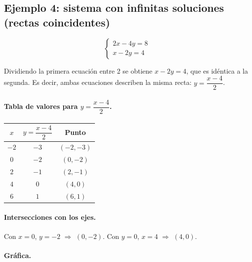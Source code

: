 \documentclass[12pt]{article}
\begin{document}
\subsection{Ejemplo 4: sistema con infinitas soluciones (rectas coincidentes)}

\[
\begin{cases}
2x - 4y = 8 \\
x - 2y = 4
\end{cases}
\]

Dividiendo la primera ecuación entre 2 se obtiene \(x-2y=4\), que es idéntica a la segunda. Es decir, ambas ecuaciones describen la misma recta: \(y=\dfrac{x-4}{2}\).

\paragraph{Tabla de valores para \(y=\dfrac{x-4}{2}\).}

\begin{center}
\begin{tabular}{ccc}
\toprule
\(x\) & \(y=\dfrac{x-4}{2}\) & Punto \\
\midrule
\(-2\) & \(-3\) & \((-2,-3)\) \\
\(0\)  & \(-2\) & \((0,-2)\) \\
\(2\)  & \(-1\) & \((2,-1)\) \\
\(4\)  & \(0\)  & \((4,0)\) \\
\(6\)  & \(1\)  & \((6,1)\) \\
\bottomrule
\end{tabular}
\end{center}

\paragraph{Intersecciones con los ejes.}

Con \(x=0\), \(y=-2\) \(\Rightarrow\) \((0,-2)\). Con \(y=0\), \(x=4\) \(\Rightarrow\) \((4,0)\).

\paragraph{Gráfica.}

\begin{center}
\end{center}
\end{document}
